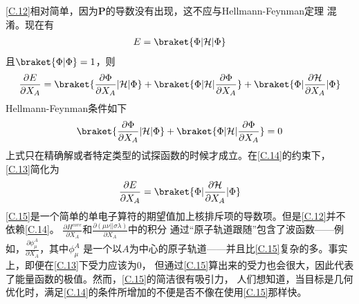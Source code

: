 \autoref{C.12}相对简单，因为$\mathbf{P}$的导数没有出现，这不应与Hellmann-Feynman定理
混淆。现在有
\begin{align}
	\nonumber
    E= \braket{\Phi |\mathcal{H} |\Phi }
\end{align}
且$\braket{\Phi |\Phi }=1$，则
\begin{align}
	\label{C.13}
    \frac{\partial E}{\partial X_A}=\braket{\frac{\partial \Phi}{\partial X_A} |\mathcal{H} |\Phi }+
									 \braket{\Phi|\mathcal{H} | \frac{\partial\Phi}{\partial X_A} }+
									 \braket{\Phi|\frac{\partial \mathcal{H}}{\partial X_A} | \Phi }
\end{align}
Hellmann-Feynman条件如下
\begin{align}
	\label{C.14}
    \braket{\frac{\partial \Phi}{\partial X_A} |\mathcal{H} |\Phi }+ \braket{\Phi|\mathcal{H} | \frac{\partial\Phi}{\partial X_A} }=0
\end{align}
上式只在精确解或者特定类型的试探函数的时候才成立。在\autoref{C.14}的约束下，\autoref{C.13}简化为
\begin{align}
	\label{C.15}
    \frac{\partial E}{\partial X_A}=\braket{\Phi|\frac{\partial \mathcal{H}}{\partial X_A} | \Phi }
\end{align}
\autoref{C.15}是一个简单的单电子算符的期望值加上核排斥项的导数项。但是\autoref{C.12}并不依赖\autoref{C.14}。
$\frac{\partial H^{core}}{\partial X_A}$和$ \frac{\partial (\mu \nu|| \sigma\lambda)}{\partial X_A}$中的积分
通过“原子轨道跟随”包含了波函数——例如，$\frac{\partial \phi_{\mu}^{A} }{\partial X_A}$，其中$\phi_{\mu}^{A}$
是一个以$A$为中心的原子轨道——并且比\autoref{C.15}复杂的多。事实上，即便在\autoref{C.13}下受力应该为0，
但通过\autoref{C.15}算出来的受力也会很大，因此代表了能量函数的极值。然而，\autoref{C.15}的简洁很有吸引力，
人们想知道，当目标是几何优化时，满足\autoref{C.14}的条件所增加的不便是否不像在使用\autoref{C.15}那样快。

